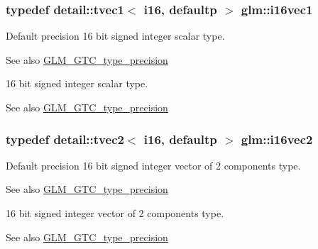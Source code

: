 \subsubsection[{\texorpdfstring{i16vec1}{i16vec1}}]{\setlength{\rightskip}{0pt plus 5cm}typedef detail\+::tvec1$<$ i16, defaultp $>$ {\bf glm\+::i16vec1}}\hypertarget{group__gtc__type__precision_gaa3a2fe05ca6a7086c5580922ebda4bf3}{}\label{group__gtc__type__precision_gaa3a2fe05ca6a7086c5580922ebda4bf3}
Default precision 16 bit signed integer scalar type. \begin{DoxySeeAlso}{See also}
\hyperlink{group__gtc__type__precision}{G\+L\+M\+\_\+\+G\+T\+C\+\_\+type\+\_\+precision}
\end{DoxySeeAlso}
16 bit signed integer scalar type. \begin{DoxySeeAlso}{See also}
\hyperlink{group__gtc__type__precision}{G\+L\+M\+\_\+\+G\+T\+C\+\_\+type\+\_\+precision} 
\end{DoxySeeAlso}
\subsubsection[{\texorpdfstring{i16vec2}{i16vec2}}]{\setlength{\rightskip}{0pt plus 5cm}typedef detail\+::tvec2$<$ i16, defaultp $>$ {\bf glm\+::i16vec2}}\hypertarget{group__gtc__type__precision_ga13f7a88281faec6a72231dce73ce6129}{}\label{group__gtc__type__precision_ga13f7a88281faec6a72231dce73ce6129}
Default precision 16 bit signed integer vector of 2 components type. \begin{DoxySeeAlso}{See also}
\hyperlink{group__gtc__type__precision}{G\+L\+M\+\_\+\+G\+T\+C\+\_\+type\+\_\+precision}
\end{DoxySeeAlso}
16 bit signed integer vector of 2 components type. \begin{DoxySeeAlso}{See also}
\hyperlink{group__gtc__type__precision}{G\+L\+M\+\_\+\+G\+T\+C\+\_\+type\+\_\+precision} 
\end{DoxySeeAlso}

